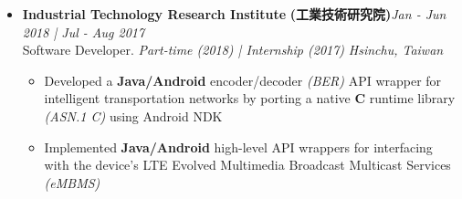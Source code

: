 \begin{itemize}[leftmargin=0pt, label={}]
{    \vspace{-7pt}
    \begin{itemize}[label=\textbullet, leftmargin=*, noitemsep]
        \item{Improved the company's POS device \textbf{Java/Kotlin/Android} application by migrating to a modern tech stack (MVVM, DI, LiveData, DataStore, Coroutines, Flow/RxJava)}
        \item{Enhanced the development efficiency by implementing a robust CI/CD pipeline, unit testing, and UI automated testing \textbf{(Kotlin/Espresso)}}
        \item{Led the migration of the codebase from \textbf{Java} to \textbf{Kotlin}, refactoring up to 40\% of the code, reducing technical debt in the process}
        \item{Composed documentation and UML diagrams describing the app's software structure and its different modules and their interactions}
    \end{itemize}
}

\item{
{\sectionheading\large{\textbf{Industrial Technology Research Institute}}} \textbf{(工業技術研究院)}\hfill {\sectionheading\small{\textit{Jan - Jun 2018 | Jul - Aug 2017}}}\\
{\sectionheading\small{Software Developer. \textit{Part-time (2018) | Internship (2017)}}}\hfill
{\sectionheading\small{\textit{Hsinchu, Taiwan}}}

    \vspace{-7pt}
    \begin{itemize}[label=\textbullet, leftmargin=*, noitemsep]
        \item{Developed a \textbf{Java/Android} encoder/decoder \textit{(BER)} API wrapper for intelligent transportation networks by porting a native \textbf{C} runtime library \textit{(ASN.1 C)} using Android NDK}
        \item{Implemented \textbf{Java/Android} high-level API wrappers for interfacing with the device's LTE Evolved Multimedia Broadcast Multicast Services \textit{(eMBMS)}}
    \end{itemize}
}

% 


\end{itemize}

